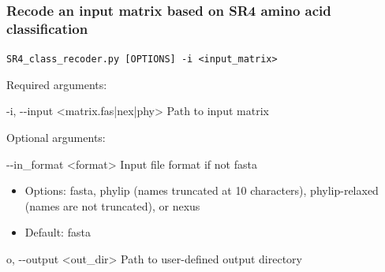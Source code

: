 \documentclass{article}
\def\code#1{\texttt{#1}}
\begin{document}
        \vspace{0.5cm}
        
        \subsubsection{Recode an input matrix based on SR4 amino acid classification}
        \begin{description}
        
            \vspace{0.2cm}
            \item \code{SR4\_class\_recoder.py [OPTIONS] -i <input\_matrix>}
            \vspace{0.2cm}
            
            \begin{description}
                \item Required arguments:
                \begin{description}
                    \item -i, -\/-input \hspace{0.2cm} <matrix.fas|nex|phy> \hspace{0.2cm} Path to input matrix
                \end{description}
            \end{description}
            \vspace{0.2cm}
            \begin{description}
                \item Optional arguments:
                \begin{description}
                    \item -\/-in\_format \hspace{0.2cm} <format> \hspace{0.2cm} Input file format if not fasta
                    \begin{itemize}
                        \item Options: fasta, phylip (names truncated at 10 characters), phylip-relaxed (names are not truncated), or nexus
                        \item Default: fasta
                    \end{itemize}
                    \item o, -\/-output \hspace{0.2cm} <out\_dir> \hspace{0.2cm} Path to user-defined output directory
                    \begin{itemize}

\end{itemize}
\end{description}
\end{description}
\end{description}
\end{document}

